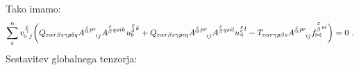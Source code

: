 Tako imamo:
\begin{equation}
   \sum^n_\varepsilon v^{\mkern 2mu \substack{\varepsilon \\[-0.65mm] \gamma \\[-0.2mm]}}_{\triangleright \mkern5mu j}
   \qty( Q_{\varepsilon   \alpha r   \beta s   \gamma p   \delta q}
   A^{\substack{\mkern2mu \varepsilon \\[-0.65mm] \alpha} \mkern2mu p r}_{\mkern29mu i j}
   A^{\substack{\mkern2mu \varepsilon \\[0.05mm] \beta} \mkern2mu q s i k} \mkern1mu
   u^{\substack{\mkern2mu \varepsilon \\[0.09mm] \delta} \mkern2mu k}_\triangleright
   +
   Q_{\varepsilon   \alpha r   \beta s   \gamma p   \epsilon q}
   A^{\substack{\mkern2mu \varepsilon \\[-0.65mm] \alpha} \mkern2mu p r}_{\mkern29mu i j}
   A^{\substack{\mkern2mu \varepsilon \\[0.05mm] \beta} \mkern2mu q s i l}
   u^{\substack{\mkern2mu \varepsilon \\[-0.55mm] \epsilon} \mkern2mu l}_\triangleleft
   -
   T_{\varepsilon   \alpha r   \gamma p   \beta s}
   A^{\substack{\mkern2mu \varepsilon \\[-0.65mm] \alpha} \mkern2mu p r}_{\mkern29mu i j}
   f^{\substack{\mkern2mu \varepsilon \\[0.55mm] \beta} \mkern2mu s i}_{\bowtie}
   ) = 0 \ .
\end{equation}
Sestavitev globalnega tenzorja:
